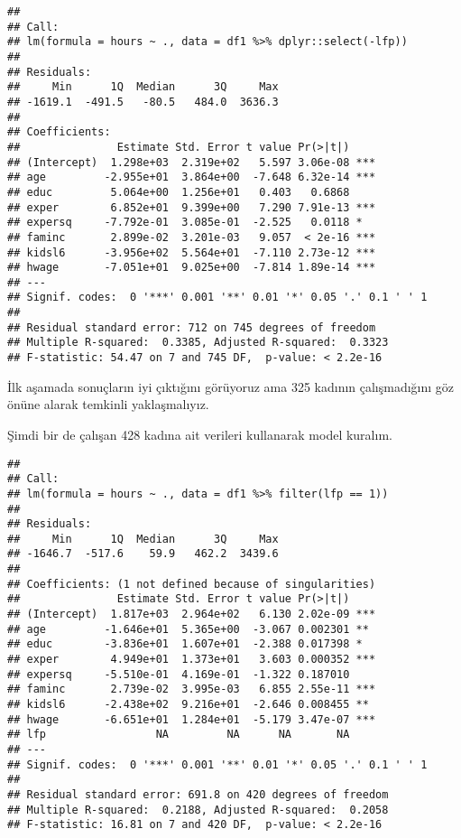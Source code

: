 \documentclass[
]{book}
\newenvironment{Shaded}{\begin{snugshade}}{\end{snugshade}}
\newcommand{\DataTypeTok}[1]{\textcolor[rgb]{0.13,0.29,0.53}{#1}}
\newcommand{\DecValTok}[1]{\textcolor[rgb]{0.00,0.00,0.81}{#1}}
\newcommand{\KeywordTok}[1]{\textcolor[rgb]{0.13,0.29,0.53}{\textbf{#1}}}
\newcommand{\NormalTok}[1]{#1}
\newcommand{\OperatorTok}[1]{\textcolor[rgb]{0.81,0.36,0.00}{\textbf{#1}}}
\newcommand{\StringTok}[1]{\textcolor[rgb]{0.31,0.60,0.02}{#1}}
\begin{document}
\begin{verbatim}
## 
## Call:
## lm(formula = hours ~ ., data = df1 %>% dplyr::select(-lfp))
## 
## Residuals:
##     Min      1Q  Median      3Q     Max 
## -1619.1  -491.5   -80.5   484.0  3636.3 
## 
## Coefficients:
##               Estimate Std. Error t value Pr(>|t|)    
## (Intercept)  1.298e+03  2.319e+02   5.597 3.06e-08 ***
## age         -2.955e+01  3.864e+00  -7.648 6.32e-14 ***
## educ         5.064e+00  1.256e+01   0.403   0.6868    
## exper        6.852e+01  9.399e+00   7.290 7.91e-13 ***
## expersq     -7.792e-01  3.085e-01  -2.525   0.0118 *  
## faminc       2.899e-02  3.201e-03   9.057  < 2e-16 ***
## kidsl6      -3.956e+02  5.564e+01  -7.110 2.73e-12 ***
## hwage       -7.051e+01  9.025e+00  -7.814 1.89e-14 ***
## ---
## Signif. codes:  0 '***' 0.001 '**' 0.01 '*' 0.05 '.' 0.1 ' ' 1
## 
## Residual standard error: 712 on 745 degrees of freedom
## Multiple R-squared:  0.3385, Adjusted R-squared:  0.3323 
## F-statistic: 54.47 on 7 and 745 DF,  p-value: < 2.2e-16
\end{verbatim}

İlk aşamada sonuçların iyi çıktığını görüyoruz ama 325 kadının çalışmadığını göz önüne alarak temkinli yaklaşmalıyız.

Şimdi bir de çalışan 428 kadına ait verileri kullanarak model kuralım.

\begin{Shaded}
\end{Shaded}

\begin{verbatim}
## 
## Call:
## lm(formula = hours ~ ., data = df1 %>% filter(lfp == 1))
## 
## Residuals:
##     Min      1Q  Median      3Q     Max 
## -1646.7  -517.6    59.9   462.2  3439.6 
## 
## Coefficients: (1 not defined because of singularities)
##               Estimate Std. Error t value Pr(>|t|)    
## (Intercept)  1.817e+03  2.964e+02   6.130 2.02e-09 ***
## age         -1.646e+01  5.365e+00  -3.067 0.002301 ** 
## educ        -3.836e+01  1.607e+01  -2.388 0.017398 *  
## exper        4.949e+01  1.373e+01   3.603 0.000352 ***
## expersq     -5.510e-01  4.169e-01  -1.322 0.187010    
## faminc       2.739e-02  3.995e-03   6.855 2.55e-11 ***
## kidsl6      -2.438e+02  9.216e+01  -2.646 0.008455 ** 
## hwage       -6.651e+01  1.284e+01  -5.179 3.47e-07 ***
## lfp                 NA         NA      NA       NA    
## ---
## Signif. codes:  0 '***' 0.001 '**' 0.01 '*' 0.05 '.' 0.1 ' ' 1
## 
## Residual standard error: 691.8 on 420 degrees of freedom
## Multiple R-squared:  0.2188, Adjusted R-squared:  0.2058 
## F-statistic: 16.81 on 7 and 420 DF,  p-value: < 2.2e-16
\end{verbatim}
\end{document}
